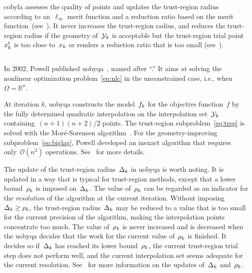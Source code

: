 \documentclass[
    smallextended,  %
    final,        %
]{svjour3}
\newcommand{\R}{\mathbb{R}}
\newcommand{\fset}{\Omega}
\newcommand{\iter}[1][k]{x\ifthenelse{\equal{#1}{}}{}{_{#1}}}
\newcommand{\objm}[1][k]{\obj\ifthenelse{\equal{#1}{}}{}{_{#1}}}
\newcommand{\obj}{f}
\newcommand{\rad}[1][k]{\Delta\ifthenelse{\equal{#1}{}}{}{_{#1}}}
\newcommand{\radlb}[1][k]{\rho\ifthenelse{\equal{#1}{}}{}{_{#1}}}
\newcommand{\trust}{{\text{t}}}
\newcommand{\xpt}[1][k]{\mathcal{Y}\ifthenelse{\equal{#1}{}}{}{_{#1}}}
\begin{document}
\gls{cobyla} assesses the quality of points and updates the trust-region radius according to
an~$\ell_\infty$ merit function and a reduction ratio based on the merit
function~(see~\cite[equations~(5),~(9), and~(10)]{Powell_1994}). It never increases
the trust-region radius, and reduces the trust-region radius if the geometry of~$\xpt$ is acceptable
but the trust-region trial point~$\iter^\trust$ is too close to~$\iter$ or renders a reduction ratio
that is too small (see~\cite[equation~(11)]{Powell_1994}).%


\subsection{}
\label{ssec:uobyqa}

In 2002, Powell published \gls{uobyqa}~\cite{Powell_2002}, named after ``.''
It aims at solving the nonlinear optimization problem~\eqref{eq:nlc} in the unconstrained case, i.e., when~$\fset = \R^n$.


At iteration $k$, \gls{uobyqa} constructs the model~$\objm$ for the objective function~$\obj$
by the fully determined quadratic interpolation on the interpolation set~$\xpt$ containing~$(n + 1)(n + 2) / 2$ points.
The trust-region subproblem~\eqref{eq:trsp} is solved with the Mor{\'{e}}-Sorensen algorithm~\cite{More_Sorensen_1983}.
For the geometry-improving subproblem~\eqref{eq:biglag}, Powell developed an inexact algorithm that requires only~$\mathcal{O}(n^2)$
operations. See~\cite[\S~2]{Powell_2002} for more details.

The update of the trust-region radius~$\rad$ in \gls{uobyqa} is worth noting.
It is updated in a way that is typical for trust-region methods, except that a  lower
bound~$\radlb$ is imposed on~$\rad$.
The value of~$\radlb[k]$ can be regarded as an indicator for the \emph{resolution} of the algorithm at the current iteration.
Without imposing~$\rad[k] \ge \radlb[k]$, the trust-region radius~$\rad[k]$ may be reduced to a
value that is too small for the current precision of the algorithm, making the interpolation points
concentrate too much.
The value of~$\radlb[k]$ is never increased and is decreased when the \gls{uobyqa} decides that the work for the current value of~$\radlb[k]$ is finished.
It decides so if~$\rad[k]$ has reached its lower bound~$\radlb[k]$,
the current trust-region trial step does not perform well,
and the current interpolation set seems adequate for the current resolution.
See~\cite[\S~3]{Powell_2002} for more information on the updates of~$\rad$ and~$\radlb[k]$.
\end{document}
